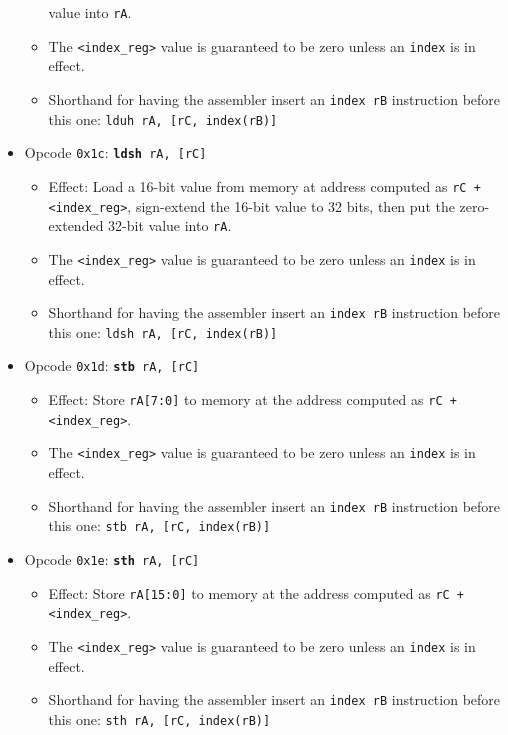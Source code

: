 \documentclass{article}
\begin{document}
\begin{itemize}
\begin{itemize}
			value into \texttt{rA}.
			\item The \texttt{<index\_reg>} value is guaranteed to be zero
			unless an \texttt{index} is in effect.
			\item Shorthand for having the assembler insert an
			\texttt{index rB} instruction before this one:
				\texttt{lduh rA, [rC, index(rB)]}
		\end{itemize}
		\item Opcode \texttt{0x1c}:
			\texttt{\textbf{ldsh} rA, [rC]}
		\begin{itemize}
			\item Effect:  Load a 16-bit value from memory at address
			computed as \texttt{rC + <index\_reg>}, sign-extend
			the 16-bit value to 32 bits, then put the zero-extended 32-bit
			value into \texttt{rA}.
			\item The \texttt{<index\_reg>} value is guaranteed to be zero
			unless an \texttt{index} is in effect.
			\item Shorthand for having the assembler insert an
			\texttt{index rB} instruction before this one:
				\texttt{ldsh rA, [rC, index(rB)]}
		\end{itemize}
		\item Opcode \texttt{0x1d}:
			\texttt{\textbf{stb} rA, [rC]}
		\begin{itemize}
			\item Effect:  Store \texttt{rA[7:0]} to memory at the address
			computed as \texttt{rC + <index\_reg>}.
			\item The \texttt{<index\_reg>} value is guaranteed to be zero
			unless an \texttt{index} is in effect.
			\item Shorthand for having the assembler insert an
			\texttt{index rB} instruction before this one:
				\texttt{stb rA, [rC, index(rB)]}
		\end{itemize}
		\item Opcode \texttt{0x1e}:
			\texttt{\textbf{sth} rA, [rC]}
		\begin{itemize}
			\item Effect:  Store \texttt{rA[15:0]} to memory at the address
			computed as \texttt{rC + <index\_reg>}.
			\item The \texttt{<index\_reg>} value is guaranteed to be zero
			unless an \texttt{index} is in effect.
			\item Shorthand for having the assembler insert an
			\texttt{index rB} instruction before this one:
				\texttt{sth rA, [rC, index(rB)]}
		\end{itemize}

	\end{itemize}
\end{document}
